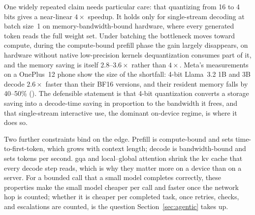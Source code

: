 One widely repeated claim needs particular care: that quantizing from 16 to 4 bits gives a near-linear $4\times$ speedup. It holds only for single-stream decoding at batch size~1 on memory-bandwidth-bound hardware, where every generated token reads the full weight set. Under batching the bottleneck moves toward compute, during the compute-bound prefill phase the gain largely disappears, on hardware without native low-precision kernels dequantization consumes part of it, and the memory saving is itself $2.8$--$3.6\times$ rather than $4\times$. Meta's measurements on a OnePlus~12 phone show the size of the shortfall: 4-bit Llama~3.2 1B and 3B decode $2.6\times$ faster than their BF16 versions, and their resident memory falls by 40--50\% \citep{meta2024llama32card} (\evC). The defensible statement is that 4-bit quantization converts a storage saving into a decode-time saving in proportion to the bandwidth it frees, and that single-stream interactive use, the dominant on-device regime, is where it does so.

Two further constraints bind on the edge. Prefill is compute-bound and sets time-to-first-token, which grows with context length; decode is bandwidth-bound and sets tokens per second. \Gls{gqa} and local--global attention shrink the \gls{kv} cache that every decode step reads, which is why they matter more on a device than on a server. For a bounded call that a small model completes correctly, these properties make the small model cheaper per call and faster once the network hop is counted; whether it is cheaper per completed task, once retries, checks, and escalations are counted, is the question Section~\ref{sec:agentic} takes up.
